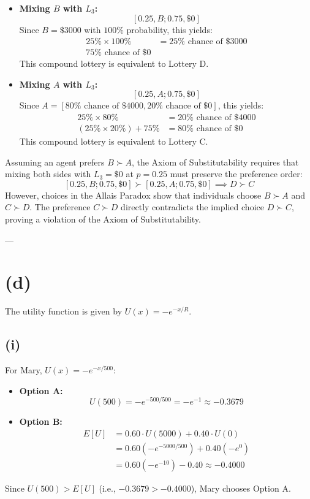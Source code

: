 \documentclass[11pt]{article}
\begin{document}
\begin{itemize}
    \item \textbf{Mixing $B$ with $L_3$:} 
    \[
    [0.25, B; 0.75, \$0]
    \]
    Since $B = \$3000$ with $100\%$ probability, this yields:
    \begin{align*}
        25\% \times 100\% &= 25\% \text{ chance of } \$3000 \\
        75\% \text{ chance of } \$0
    \end{align*}
    This compound lottery is equivalent to Lottery D.

    \item \textbf{Mixing $A$ with $L_3$:}
    \[
    [0.25, A; 0.75, \$0]
    \]
    Since $A = [80\% \text{ chance of } \$4000, 20\% \text{ chance of } \$0]$, this yields:
    \begin{align*}
        25\% \times 80\% &= 20\% \text{ chance of } \$4000 \\
        (25\% \times 20\%) + 75\% &= 80\% \text{ chance of } \$0
    \end{align*}
    This compound lottery is equivalent to Lottery C.
\end{itemize}

Assuming an agent prefers $B \succ A$, the Axiom of Substitutability requires that mixing both sides with $L_3 = \$0$ at $p = 0.25$ must preserve the preference order:
\[
[0.25, B; 0.75, \$0] \succ [0.25, A; 0.75, \$0] \implies D \succ C
\]
However, choices in the Allais Paradox show that individuals choose $B \succ A$ and $C \succ D$. The preference $C \succ D$ directly contradicts the implied choice $D \succ C$, proving a violation of the Axiom of Substitutability.

---

\section*{(d)}

The utility function is given by $U(x) = -e^{-x/R}$.

\subsection*{(i)}

For Mary, $U(x) = -e^{-x/500}$:
\begin{itemize}
    \item \textbf{Option A:}
    \[
    U(500) = -e^{-500/500} = -e^{-1} \approx -0.3679
    \]
    \item \textbf{Option B:}
    \begin{align*}
    E[U] &= 0.60 \cdot U(5000) + 0.40 \cdot U(0) \\
    &= 0.60 \left(-e^{-5000/500}\right) + 0.40 \left(-e^0\right) \\
    &= 0.60 \left(-e^{-10}\right) - 0.40 \approx -0.4000
    \end{align*}
\end{itemize}
Since $U(500) > E[U]$ (i.e., $-0.3679 > -0.4000$), Mary chooses Option A.
\end{document}
